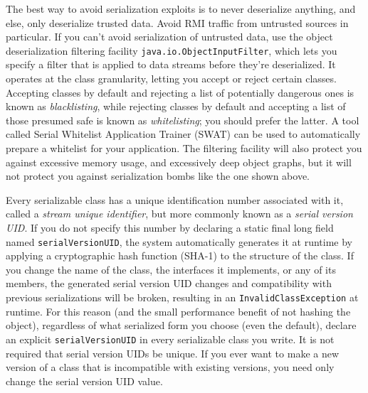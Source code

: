 \documentclass[table, xcdraw]{article}%
\begin{document}
The best way to avoid serialization exploits is to never deserialize anything, and else, only deserialize trusted data. Avoid RMI traffic from untrusted sources in particular. If you can’t avoid serialization of untrusted data, use the object deserialization filtering facility \texttt{java.io.ObjectInputFilter}, which lets you specify a filter that is applied to data streams before they’re deserialized. It operates at the class granularity, letting you accept or reject certain classes. Accepting classes by default and rejecting a list of potentially dangerous ones is known as \emph{blacklisting}, while rejecting classes by default and accepting a list of those presumed safe is known as \emph{whitelisting}; you should prefer the latter. A tool called Serial Whitelist Application Trainer (SWAT) can be used to automatically prepare a whitelist for your application. The filtering facility will also protect you against excessive memory usage, and excessively deep object graphs, but it will not protect you against serialization bombs like the one shown above.

Every serializable class has a unique identification number associated with it, called a \emph{stream unique identifier}, but more commonly known as a \emph{serial version UID}. If you do not specify this number by declaring a static final long field named
\texttt{serialVersionUID}, the system automatically generates it at runtime by applying a cryptographic hash function (SHA-1) to the structure of the class. If you change the name of the class, the interfaces it implements, or any of its members, the generated
serial version UID changes and compatibility with previous serializations will be broken, resulting in an \texttt{InvalidClassException} at runtime. For this reason (and the small performance benefit of not hashing the object), regardless of what serialized form you choose (even the default), declare an explicit \texttt{serialVersionUID} in every serializable class you write. It is not required that serial version UIDs be unique. If you ever want to make a new version of a class that is incompatible with existing versions, you need only change the serial version UID value.
\end{document}
